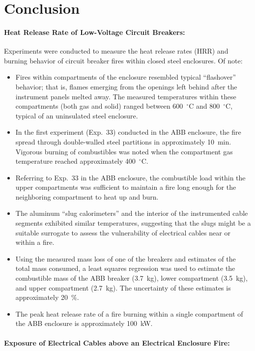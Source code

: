 \documentclass[12pt]{article}
\begin{document}
\clearpage

\section{Conclusion}

\paragraph{Heat Release Rate of Low-Voltage Circuit Breakers:}

Experiments were conducted to measure the heat release rates (HRR) and burning behavior of circuit breaker fires within closed steel enclosures. Of note:
\begin{itemize}
\item Fires within compartments of the enclosure resembled typical  ``flashover'' behavior; that is, flames emerging from the openings left behind after the instrument panels melted away. The measured temperatures within these compartments (both gas and solid) ranged between 600~$^\circ$C and 800~$^\circ$C, typical of an uninsulated steel enclosure.
\item In the first experiment (Exp.~33) conducted in the ABB enclosure, the fire spread through double-walled steel partitions in approximately 10~min. Vigorous burning of combustibles was noted when the compartment gas temperature reached approximately 400~$^\circ$C.
\item Referring to Exp.~33 in the ABB enclosure, the combustible load within the upper compartments was sufficient to maintain a fire long enough for the neighboring compartment to heat up and burn.
\item The aluminum ``slug calorimeters'' and the interior of the instrumented cable segments exhibited similar temperatures, suggesting that the slugs might be a suitable surrogate to assess the vulnerability of electrical cables near or within a fire.
\item Using the measured mass loss of one of the breakers and estimates of the total mass consumed, a least squares regression was used to estimate the combustible mass of the ABB breaker (3.7~kg), lower compartment (3.5~kg), and upper compartment (2.7~kg). The uncertainty of these estimates is approximately 20~\%.
\item The peak heat release rate of a fire burning within a single compartment of the ABB enclosure is approximately 100~kW.
\end{itemize}


\paragraph{Exposure of Electrical Cables above an Electrical Enclosure Fire:}
\end{document}
